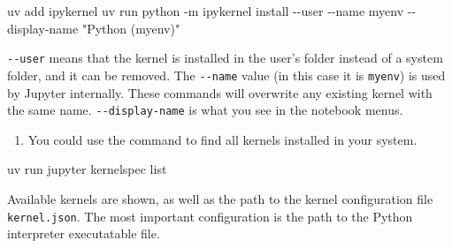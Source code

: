 \documentclass[
  letterpaper,
  DIV=11,
  numbers=noendperiod]{scrreprt}
\newenvironment{Shaded}{\begin{snugshade}}{\end{snugshade}}
\newcommand{\AttributeTok}[1]{\textcolor[rgb]{0.40,0.45,0.13}{#1}}
\newcommand{\ExtensionTok}[1]{\textcolor[rgb]{0.00,0.23,0.31}{#1}}
\newcommand{\NormalTok}[1]{\textcolor[rgb]{0.00,0.23,0.31}{#1}}
\newcommand{\StringTok}[1]{\textcolor[rgb]{0.13,0.47,0.30}{#1}}
\providecommand{\tightlist}{%
  \setlength{\itemsep}{0pt}\setlength{\parskip}{0pt}}
\theoremstyle{definition}
\theoremstyle{definition}
\theoremstyle{plain}
\theoremstyle{plain}
\theoremstyle{remark}
\begin{document}
\begin{Shaded}
\begin{Highlighting}[]
\ExtensionTok{uv}\NormalTok{ add ipykernel}
\ExtensionTok{uv}\NormalTok{ run python }\AttributeTok{{-}m}\NormalTok{ ipykernel install }\AttributeTok{{-}{-}user} \AttributeTok{{-}{-}name}\NormalTok{ myenv }\AttributeTok{{-}{-}display{-}name} \StringTok{"Python (myenv)"}
\end{Highlighting}
\end{Shaded}

\texttt{-\/-user} means that the kernel is installed in the user's
folder instead of a system folder, and it can be removed. The
\texttt{-\/-name} value (in this case it is \texttt{myenv}) is used by
Jupyter internally. These commands will overwrite any existing kernel
with the same name. \texttt{-\/-display-name} is what you see in the
notebook menus.

\begin{enumerate}
\def\labelenumi{\arabic{enumi}.}
\setcounter{enumi}{2}
\tightlist
\item
  You could use the command to find all kernels installed in your
  system.
\end{enumerate}

\begin{Shaded}
\begin{Highlighting}[]
\ExtensionTok{uv}\NormalTok{ run jupyter kernelspec list}
\end{Highlighting}
\end{Shaded}

Available kernels are shown, as well as the path to the kernel
configuration file \texttt{kernel.json}. The most important
configuration is the path to the Python interpreter executatable file.
\end{document}
